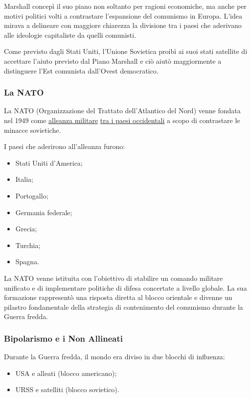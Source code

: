 \documentclass{article}
\begin{document}
Marshall concepì il suo piano non soltanto per ragioni economiche, ma anche per motivi politici
volti a contrastare l'espansione del comunismo in Europa. L'idea mirava a delineare con maggiore
chiarezza la divisione tra i paesi che aderivano alle ideologie capitaliste da quelli comunisti.

Come previsto dagli Stati Uniti, l'Unione Sovietica proibì ai suoi stati satellite di accettare
l'aiuto previsto dal Piano Marshall e ciò aiutò maggiormente a distinguere l'Est comunista
dall'Ovest democratico.

\subsubsection{La NATO}
La NATO (Organizzazione del Trattato dell'Atlantico del Nord) venne fondata nel 1949 come 
\underline{alleanza militare} \underline{tra i paesi occidentali} a scopo di contrastare le
minacce sovietiche.

I paesi che aderirono all'alleanza furono:
\begin{itemize}
    \item Stati Uniti d'America;
    \item Italia;
    \item Portogallo;
    \item Germania federale;
    \item Grecia;
    \item Turchia;
    \item Spagna.
\end{itemize}

La NATO venne istituita con l'obiettivo di stabilire un comando militare unificato e di
implementare politiche di difesa concertate a livello globale. La sua formazione rappresentò
una risposta diretta al blocco orientale e divenne un pilastro fondamentale della strategia
di contenimento del comunismo durante la Guerra fredda.

\subsubsection{Bipolarismo e i Non Allineati}
Durante la Guerra fredda, il mondo era diviso in due blocchi di influenza:
\begin{itemize}
    \item USA e alleati (blocco americano);
    \item URSS e satelliti (blocco sovietico).
\end{itemize}
\end{document}
